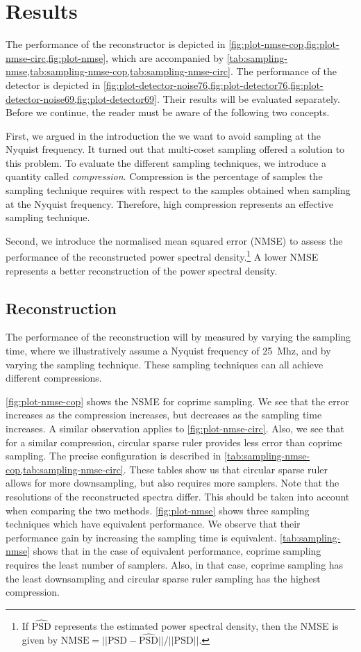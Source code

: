 \documentclass[a4paper, openany, oneside]{memoir}
\begin{document}
\section{Results}\label{sec:results_theory}
The performance of the reconstructor is depicted in \cref{fig:plot-nmse-cop,fig:plot-nmse-circ,fig:plot-nmse}, which are accompanied by \cref{tab:sampling-nmse,tab:sampling-nmse-cop,tab:sampling-nmse-circ}. The performance of the detector is depicted in \cref{fig:plot-detector-noise76,fig:plot-detector76,fig:plot-detector-noise69,fig:plot-detector69}. Their results will be evaluated separately. Before we continue, the reader must be aware of the following two concepts.

First, we argued in the introduction the we want to avoid sampling at the Nyquist frequency. It turned out that multi-coset sampling offered a solution to this problem. To evaluate the different sampling techniques, we introduce a quantity called \textit{compression}. Compression is the percentage of samples the sampling technique requires with respect to the samples obtained when sampling at the Nyquist frequency. Therefore, high compression represents an effective sampling technique.

Second, we introduce the normalised mean squared error (NMSE) to assess the performance of the reconstructed power spectral density.\footnote{If $\hat{\text{PSD}}$ represents the estimated power spectral density, then the NMSE is given by $\text{NMSE} = ||\text{PSD} - \hat{\text{PSD}}||/||\text{PSD}||$.} A lower NMSE represents a better reconstruction of the power spectral density.

\subsection{Reconstruction}
The performance of the reconstruction will by measured by varying the sampling time, where we illustratively assume a Nyquist frequency of \SI{25}{Mhz}, and by varying the sampling technique. These sampling techniques can all achieve different compressions.

\cref{fig:plot-nmse-cop} shows the NSME for coprime sampling. We see that the error increases as the compression increases, but decreases as the sampling time increases. A similar observation applies to \cref{fig:plot-nmse-circ}. Also, we see that for a similar compression, circular sparse ruler provides less error than coprime sampling. The precise configuration is described in \cref{tab:sampling-nmse-cop,tab:sampling-nmse-circ}. These tables show us that circular sparse ruler allows for more downsampling, but also requires more samplers. Note that the resolutions of the reconstructed spectra differ. This should be taken into account when comparing the two methods. \cref{fig:plot-nmse} shows three sampling techniques which have equivalent performance. We observe that their performance gain by increasing the sampling time is equivalent. \cref{tab:sampling-nmse} shows that in the case of equivalent performance, coprime sampling requires the least number of samplers. Also, in that case, coprime sampling has the least downsampling and circular sparse ruler sampling has the highest compression.
\end{document}

